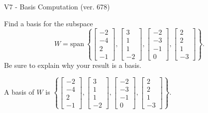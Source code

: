 \begin{exercise}
  \begin{exerciseTitle}V7 - Basis Computation (ver. 678)\end{exerciseTitle}
  \begin{exerciseStatement}
    Find a basis for the subspace 
\[W=\mathrm{span}\ \left\{\left[\begin{array}{r}
-2 \\
-4 \\
2 \\
-1
\end{array}\right] , \left[\begin{array}{r}
3 \\
1 \\
1 \\
-2
\end{array}\right] , \left[\begin{array}{r}
-2 \\
-3 \\
-1 \\
0
\end{array}\right] , \left[\begin{array}{r}
2 \\
2 \\
1 \\
-3
\end{array}\right]\right\}.\]
 Be sure to explain why your result is a basis.


  \end{exerciseStatement}
  \begin{exerciseAnswer}
   A basis of \(W\) is  \(\left\{\left[\begin{array}{r}
-2 \\
-4 \\
2 \\
-1
\end{array}\right] , \left[\begin{array}{r}
3 \\
1 \\
1 \\
-2
\end{array}\right] , \left[\begin{array}{r}
-2 \\
-3 \\
-1 \\
0
\end{array}\right] , \left[\begin{array}{r}
2 \\
2 \\
1 \\
-3
\end{array}\right]\right\}\).
  


  \end{exerciseAnswer}
\end{exercise}
